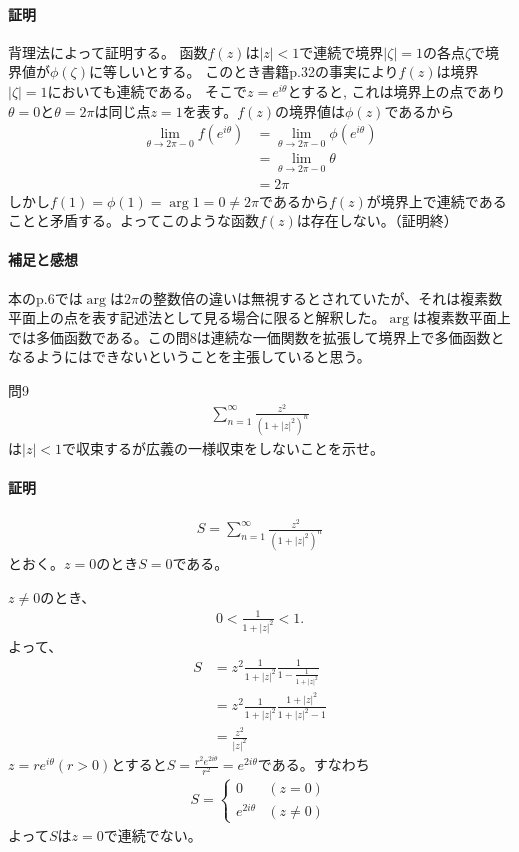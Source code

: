 \paragraph{証明}
背理法によって証明する。
函数$f(z)$は$|z|<1$で連続で境界$|\zeta|=1$の各点$\zeta$で境界値が$\phi(\zeta)$に等しいとする。
このとき書籍p.32の事実により$f(z)$は境界$|\zeta|=1$においても連続である。
そこで$z=e^{i\theta}$とすると,
これは境界上の点であり$\theta=0$と$\theta=2\pi$は同じ点$z=1$を表す。$f(z)$の境界値は$\phi(z)$であるから
\begin{align*}
    \lim_{\theta\to 2\pi-0}f(e^{i\theta})
    &=\lim_{\theta\to 2\pi-0}\phi(e^{i\theta})\\
    &=\lim_{\theta\to 2\pi-0}\theta\\
    &=2\pi
\end{align*}
しかし$f(1)=\phi(1)=\arg 1=0\neq 2\pi$であるから$f(z)$が境界上で連続であることと矛盾する。よってこのような函数$f(z)$は存在しない。（証明終）

\paragraph{補足と感想}
本のp.6では$\arg$は$2\pi$の整数倍の違いは無視するとされていたが、それは複素数平面上の点を表す記述法として見る場合に限ると解釈した。$\arg$は複素数平面上では多価函数である。この問8は連続な一価関数を拡張して境界上で多価函数となるようにはできないということを主張していると思う。

\begin{mysimplebox}{問9}
    \begin{align*}
        \sum_{n=1}^{\infty}\frac{z^2}{(1+|z|^2)^n}
    \end{align*}
    は$|z|<1$で収束するが広義の一様収束をしないことを示せ。
\end{mysimplebox}
\paragraph{証明}
\begin{align*}
    S=\sum_{n=1}^{\infty}\frac{z^2}{(1+|z|^2)^n}
\end{align*}
とおく。$z=0$のとき$S=0$である。

$z\neq 0$のとき、
\begin{align*}
    0<\frac{1}{1+|z|^2}<1.
\end{align*}
よって、
\begin{align*}
    S&=z^2\frac{1}{1+|z|^2}\frac{1}{1-\frac{1}{1+|z|^2}}\\
    &=z^2\frac{1}{1+|z|^2}\frac{1+|z|^2}{1+|z|^2-1}\\
    &=\frac{z^2}{|z|^2}
\end{align*}
$z=re^{i\theta} (r>0)$とすると$S=\frac{r^2e^{2i\theta}}{r^2}=e^{2i\theta}$である。すなわち
\begin{align*}
    S=\left\{
        \begin{array}{cc}
            0 & (z=0)\\
            e^{2i\theta} & (z\neq 0)
        \end{array}
    \right.
\end{align*}
よって$S$は$z=0$で連続でない。

